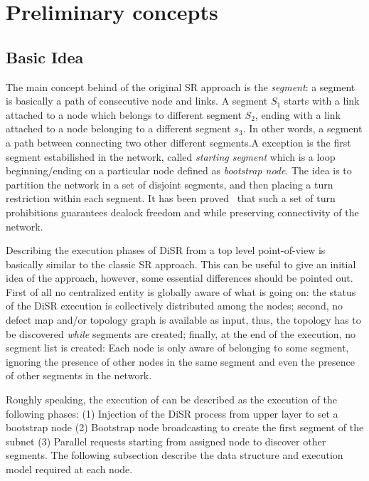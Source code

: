 
\section{Preliminary concepts}
\label{sec:disr_concepts}

\subsection{Basic Idea}
The main concept behind of the original SR approach is the
\emph{segment}: a segment is basically a path of consecutive node and
links. A segment $S_1$ starts with a link attached to a node which
belongs to different segment $S_2$, ending with a link attached to a
node belonging to a different segment $s_3$. In other words, a segment
a path between connecting two other different segments.A exception is
the first segment estabilished in the network, called \emph{starting
segment} which is  a loop beginning/ending on a particular node
defined as \emph{bootstrap node}.
The idea is to partition the network in a set of disjoint segments, and then
placing a turn restriction within each segment. It has been proved~\cite{mejia_ipdps06}
that such a set of turn prohibitions guarantees dealock freedom and
while preserving connectivity of the network.

Describing the execution phases of DiSR from a top level point-of-view
is basically similar to the classic SR approach. This can be useful to
give an initial idea of the approach, however, some essential
differences should be pointed out. First of all no centralized entity is
globally aware of what is going on: the status of the DiSR execution
is collectively distributed among the nodes; second, no defect map and/or
topology graph is available as input, thus, the topology has to be
discovered \emph{while} segments are created; finally, at the end of the
execution, no segment list is created: Each node is only aware of
belonging to some segment, ignoring the presence of other nodes
in the same segment and even the presence of other segments in the
network.

Roughly speaking, the execution of can be described as the execution
of the following phases: (1) Injection of the DiSR process from upper layer to set a bootstrap
node (2) Bootstrap node broadcasting to create the first segment of the subnet
(3) Parallel requests starting from assigned node to discover other
segments. The following subsection describe the data structure and
execution model required at each node.

